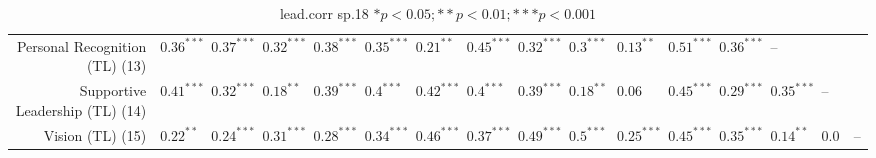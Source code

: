 \begin{table}[ht]
\begin{tabular}{rlllllllllllllll}
  Personal Recognition (TL) (13) & $0.36^{***}$ & $0.37^{***}$ & $0.32^{***}$ & $0.38^{***}$ & $0.35^{***}$ & $0.21^{**}$ & $0.45^{***}$ & $0.32^{***}$ & $0.3^{***}$ & $0.13^{**}$ & $0.51^{***}$ & $0.36^{***}$ & -- &  &  \\ 
  Supportive Leadership (TL) (14) & $0.41^{***}$ & $0.32^{***}$ & $0.18^{**}$ & $0.39^{***}$ & $0.4^{***}$ & $0.42^{***}$ & $0.4^{***}$ & $0.39^{***}$ & $0.18^{**}$ & $0.06$ & $0.45^{***}$ & $0.29^{***}$ & $0.35^{***}$ & -- &  \\ 
  Vision (TL) (15) & $0.22^{**}$ & $0.24^{***}$ & $0.31^{***}$ & $0.28^{***}$ & $0.34^{***}$ & $0.46^{***}$ & $0.37^{***}$ & $0.49^{***}$ & $0.5^{***}$ & $0.25^{***}$ & $0.45^{***}$ & $0.35^{***}$ & $0.14^{**}$ & $0.06$ & -- \\ 
   \hline
\end{tabular}
\caption{lead.corr sp.18 $* p < 0.05; ** p < 0.01; *** p < 0.001$} 
\label{freq_corr.lead.corr.sp.18}
\end{table}
